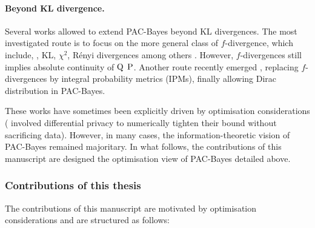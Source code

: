 \paragraph{Beyond KL divergence.} Several works allowed to extend PAC-Bayes beyond KL divergences. The most investigated route is to focus on the more general class of $f$-divergence, which include, \eg, KL, $\chi^2$, Rényi divergences among others \citep{alquier2018simpler,ohnishi2021novel,picard2022change,viallard2023general}. However, $f$-divergences still implies absolute continuity of $\Q$ \wrt $\P$. Another route recently emerged \citep{amit2022integral}, replacing $f$-divergences by integral probability metrics (IPMs), finally allowing Dirac distribution in PAC-Bayes.


These works have sometimes been explicitly driven by optimisation considerations (\citealp{dziugaite2018data} involved differential privacy to numerically tighten their bound without sacrificing data). However, in many cases, the information-theoretic vision of PAC-Bayes remained majoritary. In what follows, the contributions of this manuscript are designed \wrt the optimisation view of PAC-Bayes detailed above. 

\subsubsection*{Contributions of this thesis}

The contributions of this manuscript are motivated by optimisation considerations and are structured as follows: 

